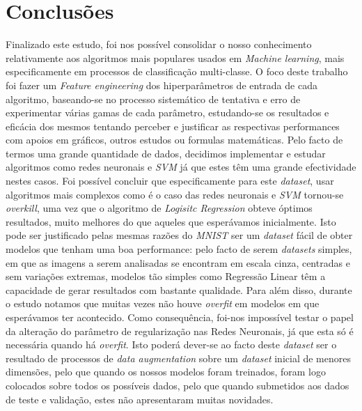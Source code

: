 \section{Conclusões}
Finalizado este estudo, foi nos possível consolidar o nosso conhecimento relativamente aos algoritmos mais populares usados em \textit{Machine learning}, mais especificamente em processos de classificação multi-classe. 
O foco deste trabalho foi fazer um \textit{Feature engineering} dos hiperparâmetros de entrada de cada algoritmo, baseando-se no processo sistemático de tentativa e erro de experimentar várias gamas de cada parâmetro, estudando-se os resultados e eficácia dos mesmos tentando perceber e justificar as respectivas performances com apoios em gráficos, outros estudos ou formulas matemáticas.
Pelo facto de termos uma grande quantidade de dados, decidimos implementar e estudar algoritmos como redes neuronais e \textit{SVM} já que estes têm uma grande efectividade nestes casos.
Foi possível concluir que especificamente para este \textit{dataset}, usar algoritmos mais complexos como é o caso das redes neuronais e \textit{SVM} tornou-se \textit{overkill}, uma vez que o algoritmo de \textit{Logisitc Regression} obteve óptimos resultados, muito melhores do que aqueles que esperávamos inicialmente. Isto pode ser justificado pelas mesmas razões do \textit{MNIST} ser um \textit{dataset} fácil de obter modelos que tenham uma boa performance: pelo facto de serem \textit{datasets} simples, em que as imagens a serem analisadas se encontram em escala cinza, centradas e sem variações extremas, modelos tão simples como Regressão Linear têm a capacidade de gerar resultados com bastante qualidade.
Para além disso, durante o estudo notamos que muitas vezes não houve \textit{overfit} em modelos em que esperávamos ter acontecido. Como consequência, foi-nos impossível testar o papel da alteração do parâmetro de regularização nas Redes Neuronais, já que esta só é necessária quando há \textit{overfit}. Isto poderá dever-se ao facto deste \textit{dataset} ser o resultado de processos de \textit{data augmentation} sobre um \textit{dataset} inicial de menores dimensões, pelo que quando os nossos modelos foram treinados, foram logo colocados sobre todos os possíveis dados, pelo que quando submetidos aos dados de teste e validação, estes não apresentaram muitas novidades.
